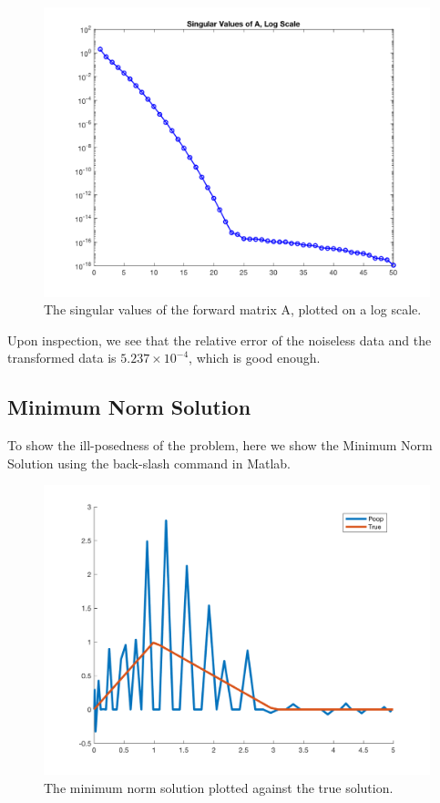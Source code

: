 \documentclass{article}
\begin{document}
\begin{figure}[H]
    \centerline{
    \includegraphics[height = 10 cm]{SingularValues.png}
    }
    \caption{\label{fig:Singular Values} The singular values of the forward matrix A, plotted on a log scale.}
\end{figure}

Upon inspection, we see that the relative error of the noiseless data and the transformed data is $5.237 \times 10^{-4}$, which is good enough.

\subsection{Minimum Norm Solution}

To show the ill-posedness of the problem, here we show the Minimum Norm Solution using the back-slash command in Matlab.

\begin{figure}[H]
    \centerline{
    \includegraphics[height = 10 cm]{PoopSolution.png}
    }
    \caption{\label{fig:Poop Solution} The minimum norm solution plotted against the true solution.}
\end{figure}
\end{document}
